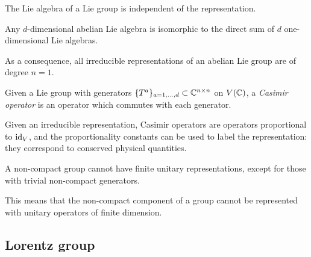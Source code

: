 \begin{proposition}
  The Lie algebra of a Lie group is independent of the representation.
\end{proposition}

\begin{proposition}
  Any $ d $-dimensional abelian Lie algebra is isomorphic to the direct sum of $ d $ one-dimensional Lie algebras.
\end{proposition}

As a consequence, all irreducible representations of an abelian Lie group are of degree $ n = 1 $.

\begin{definition}
  Given a Lie group with generators $ \{T^a\}_{a = 1, \dots, d} \subset \mathbb{C}^{n \times n} $ on $ V(\mathbb{C}) $, a \textit{Casimir operator} is an operator which commutes with each generator.
\end{definition}

Given an irreducible representation, Casimir operators are operators proportional to $ \operatorname{id}_V $, and the proportionality constants can be used to label the representation: they correspond to conserved physical quantities.

\begin{proposition}
  A non-compact group cannot have finite unitary representations, except for those with trivial non-compact generators.
\end{proposition}

This means that the non-compact component of a group cannot be represented with unitary operators of finite dimension.

\subsection{Lorentz group}

